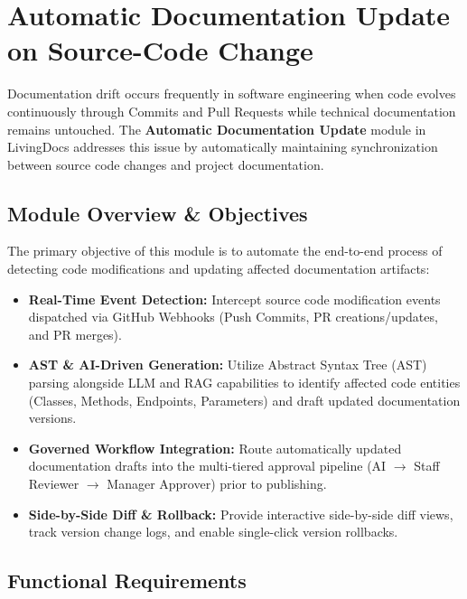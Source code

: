 \section{Automatic Documentation Update on Source-Code Change}

Documentation drift occurs frequently in software engineering when code evolves continuously through Commits and Pull Requests while technical documentation remains untouched. The \textbf{Automatic Documentation Update} module in LivingDocs addresses this issue by automatically maintaining synchronization between source code changes and project documentation.

\subsection{Module Overview \& Objectives}
The primary objective of this module is to automate the end-to-end process of detecting code modifications and updating affected documentation artifacts:
\begin{itemize}
    \item \textbf{Real-Time Event Detection:} Intercept source code modification events dispatched via GitHub Webhooks (Push Commits, PR creations/updates, and PR merges).
    \item \textbf{AST \& AI-Driven Generation:} Utilize Abstract Syntax Tree (AST) parsing alongside LLM and RAG capabilities to identify affected code entities (Classes, Methods, Endpoints, Parameters) and draft updated documentation versions.
    \item \textbf{Governed Workflow Integration:} Route automatically updated documentation drafts into the multi-tiered approval pipeline (AI $\rightarrow$ Staff Reviewer $\rightarrow$ Manager Approver) prior to publishing.
    \item \textbf{Side-by-Side Diff \& Rollback:} Provide interactive side-by-side diff views, track version change logs, and enable single-click version rollbacks.
\end{itemize}

\subsection{Functional Requirements}

